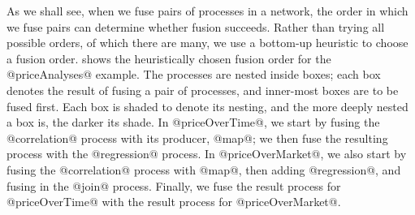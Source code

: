 As we shall see, when we fuse pairs of processes in a network, the order in which we fuse pairs can determine whether fusion succeeds.
Rather than trying all possible orders, of which there are many, we use a bottom-up heuristic to choose a fusion order.
 shows the heuristically chosen fusion order for the @priceAnalyses@ example.
The processes are nested inside boxes; each box denotes the result of fusing a pair of processes, and inner-most boxes are to be fused first.
Each box is shaded to denote its nesting, and the more deeply nested a box is, the darker its shade.
In @priceOverTime@, we start by fusing the @correlation@ process with its producer, @map@; we then fuse the resulting process with the @regression@ process.
In @priceOverMarket@, we also start by fusing the @correlation@ process with @map@, then adding @regression@, and fusing in the @join@ process.
Finally, we fuse the result process for @priceOverTime@ with the result process for @priceOverMarket@.



